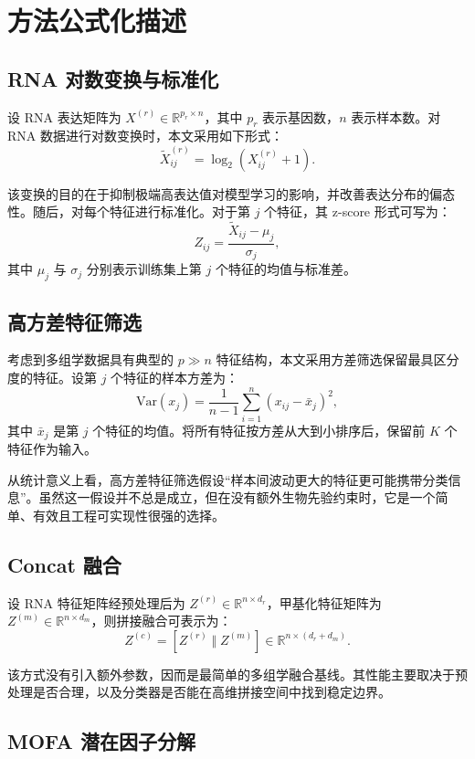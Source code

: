 \section{方法公式化描述}

\subsection{RNA 对数变换与标准化}

设 RNA 表达矩阵为 $X^{(r)} \in \mathbb{R}^{p_r \times n}$，其中 $p_r$ 表示基因数，$n$ 表示样本数。对 RNA 数据进行对数变换时，本文采用如下形式：
\[
\tilde{X}^{(r)}_{ij} = \log_2\left(X^{(r)}_{ij} + 1\right).
\]

该变换的目的在于抑制极端高表达值对模型学习的影响，并改善表达分布的偏态性。随后，对每个特征进行标准化。对于第 $j$ 个特征，其 z-score 形式可写为：
\[
Z_{ij} = \frac{\tilde{X}_{ij} - \mu_j}{\sigma_j},
\]
其中 $\mu_j$ 与 $\sigma_j$ 分别表示训练集上第 $j$ 个特征的均值与标准差。

\subsection{高方差特征筛选}

考虑到多组学数据具有典型的 $p \gg n$ 特征结构，本文采用方差筛选保留最具区分度的特征。设第 $j$ 个特征的样本方差为：
\[
\mathrm{Var}(x_j) = \frac{1}{n-1} \sum_{i=1}^{n} (x_{ij} - \bar{x}_j)^2,
\]
其中 $\bar{x}_j$ 是第 $j$ 个特征的均值。将所有特征按方差从大到小排序后，保留前 $K$ 个特征作为输入。

从统计意义上看，高方差特征筛选假设“样本间波动更大的特征更可能携带分类信息”。虽然这一假设并不总是成立，但在没有额外生物先验约束时，它是一个简单、有效且工程可实现性很强的选择。

\subsection{Concat 融合}

设 RNA 特征矩阵经预处理后为 $Z^{(r)} \in \mathbb{R}^{n \times d_r}$，甲基化特征矩阵为 $Z^{(m)} \in \mathbb{R}^{n \times d_m}$，则拼接融合可表示为：
\[
Z^{(c)} = [Z^{(r)} \;\Vert\; Z^{(m)}] \in \mathbb{R}^{n \times (d_r + d_m)}.
\]

该方式没有引入额外参数，因而是最简单的多组学融合基线。其性能主要取决于预处理是否合理，以及分类器是否能在高维拼接空间中找到稳定边界。

\subsection{MOFA 潜在因子分解}

